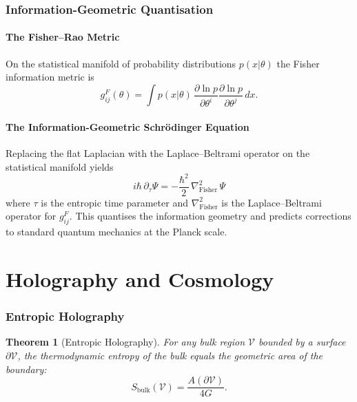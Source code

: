 \documentclass[12pt,a4paper]{article}
\newtheorem{theorem}{Theorem}[section]
\begin{document}
\section{Information-Geometric Quantisation}
\label{sec:quantisation}

\subsection{The Fisher--Rao Metric}

On the statistical manifold of probability distributions $p(x|\theta)$ the
Fisher information metric is
\begin{equation}
  g_{ij}^{F}(\theta)
  = \int p(x|\theta)\,
    \frac{\partial\ln p}{\partial\theta^i}
    \frac{\partial\ln p}{\partial\theta^j}\,dx .
  \label{eq:fisher}
\end{equation}

\subsection{The Information-Geometric Schrödinger Equation}

Replacing the flat Laplacian with the Laplace--Beltrami operator on the
statistical manifold yields
\begin{equation}
  \boxed{
  i\hbar\,\partial_\tau\Psi
  = -\frac{\hbar^2}{2}\,\nabla_{\text{Fisher}}^2\,\Psi
  }
  \label{eq:IG-schrodinger}
\end{equation}
where $\tau$ is the entropic time parameter and $\nabla_{\text{Fisher}}^2$ is
the Laplace--Beltrami operator for $g^F_{ij}$.  This quantises the information
geometry and predicts corrections to standard quantum mechanics at the Planck
scale.

\part{Holography and Cosmology}

\section{Entropic Holography}
\label{sec:holography}

\begin{theorem}[Entropic Holography]
  For any bulk region $\mathcal{V}$ bounded by a surface $\partial\mathcal{V}$,
  the thermodynamic entropy of the bulk equals the geometric area of the
  boundary:
  \begin{equation}
    S_{\text{bulk}}(\mathcal{V}) = \frac{A(\partial\mathcal{V})}{4G} .
    \label{eq:holography}
  \end{equation}
\end{theorem}
\end{document}
